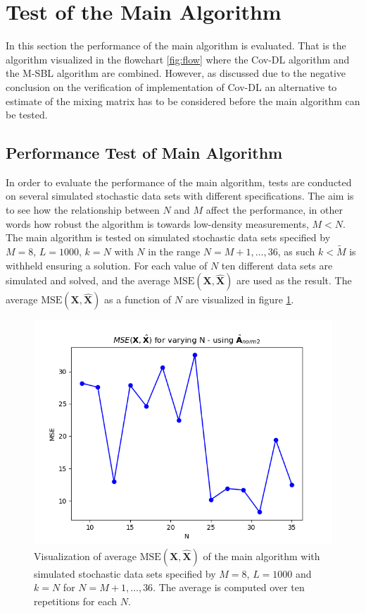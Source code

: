 \section{Test of the Main Algorithm}\label{sec:test_base}
In this section the performance of the main algorithm is evaluated. 
That is the algorithm visualized in the flowchart \ref{fig:flow} where the Cov-DL algorithm and the M-SBL algorithm are combined. 
However, as discussed due to the negative conclusion on the verification of implementation of Cov-DL an alternative to estimate of the mixing matrix has to be considered before the main algorithm can be tested.  
 
  

\subsection{Performance Test of Main Algorithm}\label{sec:Main_test}
In order to evaluate the performance of the main algorithm, tests are conducted on several simulated stochastic data sets with different specifications. 
The aim is to see how the relationship between $N$ and $M$ affect the performance, in other words how robust the algorithm is towards low-density measurements, $M < N$. 
The main algorithm is tested on simulated stochastic data sets specified by $M = 8$, $L = 1000$, $k = N$ with $N$ in the range $N = M+1, \dots, 36$, as such $k < \widetilde{M}$ is withheld ensuring a solution.
For each value of $N$ ten different data sets are simulated and solved, and the average $\text{MSE}(\mathbf{X}, \hat{\mathbf{X}})$ are used as the result. 
The average $\text{MSE}(\mathbf{X}, \hat{\mathbf{X}})$ as a function of $N$ are visualized in figure \ref{fig:varyN1}.
\begin{figure}[H]
    \centering
	\includegraphics[scale=0.5]{figures/ch_6/varyN1.png}
	\caption{Visualization of average $\text{MSE}(\mathbf{X}, \hat{\mathbf{X}})$ of the main algorithm with simulated stochastic data sets specified by $M = 8$, $L = 1000$ and $k = N$ for $N = M+1, \dots , 36$. The average is computed over ten repetitions for each $N$.}
	\label{fig:varyN1}
\end{figure}
